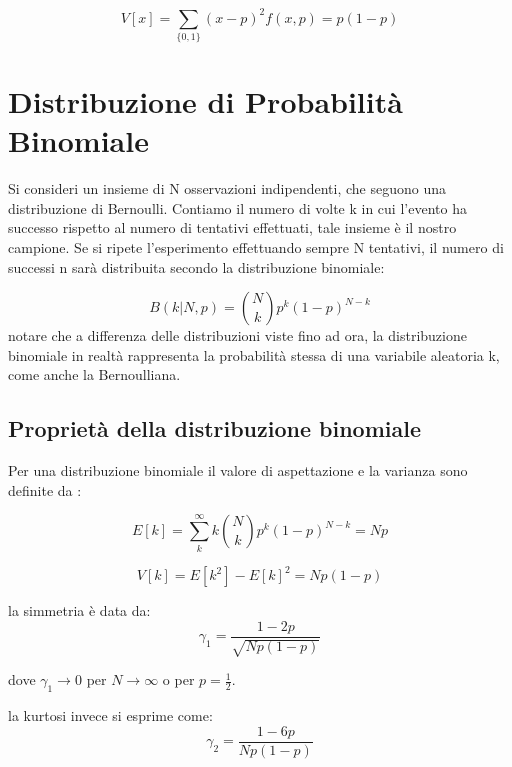 \documentclass[11pt,a4paper]{book}
\begin{document}
\begin{equation}
	V[x] = \sum_{\{0,1\}}(x-p)^2f(x,p) = p(1-p)
\end{equation}

\section{Distribuzione di Probabilit\`{a} Binomiale}

Si consideri un insieme di N osservazioni indipendenti, che seguono una distribuzione di Bernoulli. Contiamo il numero di volte k in cui l'evento ha successo rispetto al numero di tentativi effettuati, tale insieme \`{e} il nostro campione. Se si ripete l'esperimento effettuando sempre N tentativi, il numero di successi n sar\`{a} distribuita secondo la distribuzione binomiale:

\begin{equation*}
	B(k \vert N,p) = \binom{N}{k}p^k(1-p)^{N-k}
\end{equation*} 
\newline
notare che a differenza delle distribuzioni viste fino ad ora, la distribuzione binomiale in realt\`{a} rappresenta la probabilit\`{a} stessa di una variabile aleatoria k, come anche la Bernoulliana.

\subsection{Propriet\`{a} della distribuzione binomiale}

Per una distribuzione binomiale il valore di aspettazione e la varianza sono definite da :

\begin{equation}
	E[k] = \sum_{k}^\infty k \binom{N}{k}p^k(1-p)^{N-k} = Np
\end{equation}

\begin{equation}
	V[k] = E[k^2] - E[k]^2 = Np(1-p)
\end{equation}

\noindent la simmetria \`{e} data da:
\begin{equation}
	\gamma_1 = \dfrac{1-2p}{\sqrt{Np(1-p)}}
\end{equation}

dove $\gamma_1 \rightarrow 0 $ per $N \rightarrow \infty $ o per $p = \frac{1}{2}$.\newline

la kurtosi invece si esprime come:
\begin{equation}
	\gamma_2 = \dfrac{1-6p}{Np(1-p)}
\end{equation}
\end{document}
